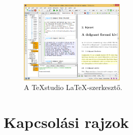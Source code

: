 \begin{figure}[!ht]
\centering
\includegraphics[width=50mm, keepaspectratio]{figures/TeXstudio.png}
\caption{A TeXstudio \LaTeX-szerkesztő.} 
\end{figure}


\clearpage
\section{Kapcsolási rajzok}


